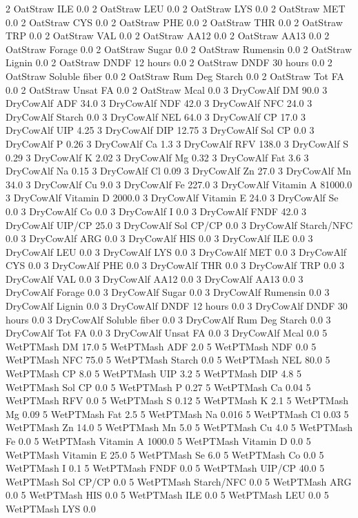 \documentclass[letterpaper,10pt,english]{sphinxmanual}
\begin{document}
\begin{sphinxVerbatim}[commandchars=\\\{\},numbers=left,firstnumber=1,stepnumber=1]
2 OatStraw ILE 0.0
2 OatStraw LEU 0.0
2 OatStraw LYS 0.0
2 OatStraw MET 0.0
2 OatStraw CYS 0.0
2 OatStraw PHE 0.0
2 OatStraw THR 0.0
2 OatStraw TRP 0.0
2 OatStraw VAL 0.0
2 OatStraw AA\PYGZsh{}12 0.0
2 OatStraw AA\PYGZsh{}13 0.0
2 OatStraw \PYGZpc{} Forage 0.0
2 OatStraw Sugar \PYGZpc{} 0.0
2 OatStraw Rumensin 0.0
2 OatStraw Lignin 0.0
2 OatStraw DNDF 12 hours 0.0
2 OatStraw DNDF 30 hours 0.0
2 OatStraw Soluble fiber 0.0
2 OatStraw Rum Deg Starch 0.0
2 OatStraw Tot FA 0.0
2 OatStraw Unsat FA 0.0
2 OatStraw Mcal 0.0
3 DryCowAlf DM 90.0
3 DryCowAlf ADF 34.0
3 DryCowAlf NDF 42.0
3 DryCowAlf NFC 24.0
3 DryCowAlf Starch 0.0
3 DryCowAlf NEL 64.0
3 DryCowAlf CP 17.0
3 DryCowAlf UIP 4.25
3 DryCowAlf DIP 12.75
3 DryCowAlf Sol CP 0.0
3 DryCowAlf P 0.26
3 DryCowAlf Ca 1.3
3 DryCowAlf RFV 138.0
3 DryCowAlf S 0.29
3 DryCowAlf K 2.02
3 DryCowAlf Mg 0.32
3 DryCowAlf Fat 3.6
3 DryCowAlf Na 0.15
3 DryCowAlf Cl 0.09
3 DryCowAlf Zn 27.0
3 DryCowAlf Mn 34.0
3 DryCowAlf Cu 9.0
3 DryCowAlf Fe 227.0
3 DryCowAlf Vitamin A 81000.0
3 DryCowAlf Vitamin D 2000.0
3 DryCowAlf Vitamin E 24.0
3 DryCowAlf Se 0.0
3 DryCowAlf Co 0.0
3 DryCowAlf I 0.0
3 DryCowAlf FNDF 42.0
3 DryCowAlf UIP/CP 25.0
3 DryCowAlf Sol CP/CP 0.0
3 DryCowAlf Starch/NFC 0.0
3 DryCowAlf ARG 0.0
3 DryCowAlf HIS 0.0
3 DryCowAlf ILE 0.0
3 DryCowAlf LEU 0.0
3 DryCowAlf LYS 0.0
3 DryCowAlf MET 0.0
3 DryCowAlf CYS 0.0
3 DryCowAlf PHE 0.0
3 DryCowAlf THR 0.0
3 DryCowAlf TRP 0.0
3 DryCowAlf VAL 0.0
3 DryCowAlf AA\PYGZsh{}12 0.0
3 DryCowAlf AA\PYGZsh{}13 0.0
3 DryCowAlf \PYGZpc{} Forage 0.0
3 DryCowAlf Sugar \PYGZpc{} 0.0
3 DryCowAlf Rumensin 0.0
3 DryCowAlf Lignin 0.0
3 DryCowAlf DNDF 12 hours 0.0
3 DryCowAlf DNDF 30 hours 0.0
3 DryCowAlf Soluble fiber 0.0
3 DryCowAlf Rum Deg Starch 0.0
3 DryCowAlf Tot FA 0.0
3 DryCowAlf Unsat FA 0.0
3 DryCowAlf Mcal 0.0
5 WetPTMash DM 17.0
5 WetPTMash ADF 2.0
5 WetPTMash NDF 0.0
5 WetPTMash NFC 75.0
5 WetPTMash Starch 0.0
5 WetPTMash NEL 80.0
5 WetPTMash CP 8.0
5 WetPTMash UIP 3.2
5 WetPTMash DIP 4.8
5 WetPTMash Sol CP 0.0
5 WetPTMash P 0.27
5 WetPTMash Ca 0.04
5 WetPTMash RFV 0.0
5 WetPTMash S 0.12
5 WetPTMash K 2.1
5 WetPTMash Mg 0.09
5 WetPTMash Fat 2.5
5 WetPTMash Na 0.016
5 WetPTMash Cl 0.03
5 WetPTMash Zn 14.0
5 WetPTMash Mn 5.0
5 WetPTMash Cu 4.0
5 WetPTMash Fe 0.0
5 WetPTMash Vitamin A 1000.0
5 WetPTMash Vitamin D 0.0
5 WetPTMash Vitamin E 25.0
5 WetPTMash Se 6.0
5 WetPTMash Co 0.0
5 WetPTMash I 0.1
5 WetPTMash FNDF 0.0
5 WetPTMash UIP/CP 40.0
5 WetPTMash Sol CP/CP 0.0
5 WetPTMash Starch/NFC 0.0
5 WetPTMash ARG 0.0
5 WetPTMash HIS 0.0
5 WetPTMash ILE 0.0
5 WetPTMash LEU 0.0
5 WetPTMash LYS 0.0

\end{sphinxVerbatim}
\end{document}

